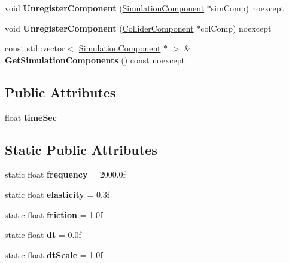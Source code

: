 \begin{DoxyCompactItemize}
\mbox{\label{class_blade_1_1_simulation_system_abbe62f3517c05851909ee221d5a48c44}} 
void {\bfseries Unregister\+Component} (\hyperlink{class_blade_1_1_simulation_component}{Simulation\+Component} $\ast$sim\+Comp) noexcept
\item 
\mbox{\label{class_blade_1_1_simulation_system_ade3b0573c4addb1a306179fcc50a7454}} 
void {\bfseries Unregister\+Component} (\hyperlink{class_blade_1_1_collider_component}{Collider\+Component} $\ast$col\+Comp) noexcept
\item 
\mbox{\label{class_blade_1_1_simulation_system_a768e9c35386f9c52e2b06ce381ce7050}} 
const std\+::vector$<$ \hyperlink{class_blade_1_1_simulation_component}{Simulation\+Component} $\ast$ $>$ \& {\bfseries Get\+Simulation\+Components} () const noexcept
\end{DoxyCompactItemize}
\subsection*{Public Attributes}
\begin{DoxyCompactItemize}
\item 
\mbox{\label{class_blade_1_1_simulation_system_a529db90489191ac072e3906326393a3a}} 
float {\bfseries time\+Sec}
\end{DoxyCompactItemize}
\subsection*{Static Public Attributes}
\begin{DoxyCompactItemize}
\item 
\mbox{\label{class_blade_1_1_simulation_system_afb86549d4ab57f5a426aa8cf228d76eb}} 
static float {\bfseries frequency} = 2000.\+0f
\item 
\mbox{\label{class_blade_1_1_simulation_system_aa7d0bb11aafd59e102723b08271c7d9e}} 
static float {\bfseries elasticity} = 0.\+3f
\item 
\mbox{\label{class_blade_1_1_simulation_system_a899426b05cdf0fa83104ea106a2aab04}} 
static float {\bfseries friction} = 1.\+0f
\item 
\mbox{\label{class_blade_1_1_simulation_system_a046b4016dac9015dc1b3cb2c59cdf860}} 
static float {\bfseries dt} = 0.\+0f
\item 
\mbox{\label{class_blade_1_1_simulation_system_ad7c3441e3a8a9b97fbdd12ec936b963e}} 
static float {\bfseries dt\+Scale} = 1.\+0f
\end{DoxyCompactItemize}


